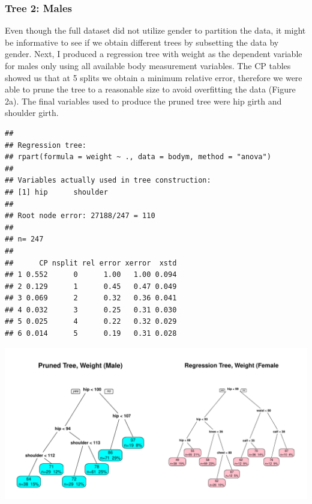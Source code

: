 \documentclass[11pt]{article}\usepackage[]{graphicx}\usepackage[]{color}
\makeatletter
\def\maxwidth{ %
  \ifdim\Gin@nat@width>\linewidth
    \linewidth
  \else
    \Gin@nat@width
  \fi
}
\newenvironment{kframe}{%
 \def\at@end@of@kframe{}%
 \ifinner\ifhmode%
  \def\at@end@of@kframe{\end{minipage}}%
  \begin{minipage}{\columnwidth}%
 \fi\fi%
 \def\FrameCommand##1{\hskip\@totalleftmargin \hskip-\fboxsep
 \colorbox{shadecolor}{##1}\hskip-\fboxsep
     \hskip-\linewidth \hskip-\@totalleftmargin \hskip\columnwidth}%
 \MakeFramed {\advance\hsize-\width
   \@totalleftmargin\z@ \linewidth\hsize
   \@setminipage}}%
 {\par\unskip\endMakeFramed%
 \at@end@of@kframe}
\newenvironment{knitrout}{}{} %
\makeatother
\begin{document}
\subsubsection{Tree 2: Males} 
Even though the full dataset did not utilize gender to partition the data, it might be informative to see if we obtain different trees by subsetting the data by gender. Next, I produced a regression tree with weight as the dependent variable for males only using all available body measurement variables. The CP tables showed us that at 5 splits we obtain a minimum relative error, therefore we were able to prune the tree to a reasonable size to avoid overfitting the data (Figure 2a). The final variables used to produce the pruned tree were hip girth and shoulder girth.

\begin{knitrout}
\color{fgcolor}\begin{kframe}
\begin{verbatim}
## 
## Regression tree:
## rpart(formula = weight ~ ., data = bodym, method = "anova")
## 
## Variables actually used in tree construction:
## [1] hip      shoulder
## 
## Root node error: 27188/247 = 110
## 
## n= 247 
## 
##      CP nsplit rel error xerror  xstd
## 1 0.552      0      1.00   1.00 0.094
## 2 0.129      1      0.45   0.47 0.049
## 3 0.069      2      0.32   0.36 0.041
## 4 0.032      3      0.25   0.31 0.030
## 5 0.025      4      0.22   0.32 0.029
## 6 0.014      5      0.19   0.31 0.028
\end{verbatim}
\end{kframe}
\end{knitrout}


\begin{knitrout}
\color{fgcolor}
\includegraphics[width=\maxwidth]{figure/mtrees} 

\end{knitrout}
\end{document}
